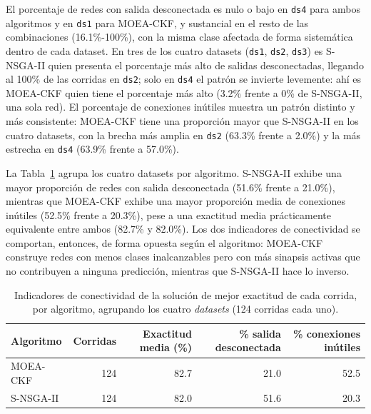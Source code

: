 El porcentaje de redes con salida desconectada es nulo o bajo en \texttt{ds4} para ambos algoritmos y en \texttt{ds1} para MOEA-CKF, y sustancial en el resto de las combinaciones (16.1\%-100\%), con la misma clase afectada de forma sistemática dentro de cada dataset. En tres de los cuatro datasets (\texttt{ds1}, \texttt{ds2}, \texttt{ds3}) es S-NSGA-II quien presenta el porcentaje más alto de salidas desconectadas, llegando al 100\% de las corridas en \texttt{ds2}; solo en \texttt{ds4} el patrón se invierte levemente: ahí es MOEA-CKF quien tiene el porcentaje más alto (3.2\% frente a 0\% de S-NSGA-II, una sola red). El porcentaje de conexiones inútiles muestra un patrón distinto y más consistente: MOEA-CKF tiene una proporción mayor que S-NSGA-II en los cuatro datasets, con la brecha más amplia en \texttt{ds2} (63.3\% frente a 2.0\%) y la más estrecha en \texttt{ds4} (63.9\% frente a 57.0\%).

La Tabla~\ref{tab:conectividad-algo} agrupa los cuatro datasets por algoritmo. S-NSGA-II exhibe una mayor proporción de redes con salida desconectada (51.6\% frente a 21.0\%), mientras que MOEA-CKF exhibe una mayor proporción media de conexiones inútiles (52.5\% frente a 20.3\%), pese a una exactitud media prácticamente equivalente entre ambos (82.7\% y 82.0\%). Los dos indicadores de conectividad se comportan, entonces, de forma opuesta según el algoritmo: MOEA-CKF construye redes con menos clases inalcanzables pero con más sinapsis activas que no contribuyen a ninguna predicción, mientras que S-NSGA-II hace lo inverso.

\begin{table}[htbp]
\centering
\small
\caption{Indicadores de conectividad de la solución de mejor exactitud de cada corrida, por algoritmo, agrupando los cuatro \textit{datasets} (124 corridas cada uno).}
\label{tab:conectividad-algo}
\begin{tabular}{lrrrr}
\toprule
\textbf{Algoritmo} & \textbf{Corridas} & \textbf{Exactitud media} (\%) & \% \textbf{salida desconectada} & \% \textbf{conexiones inútiles} \\
\midrule
MOEA-CKF & 124 & 82.7 & 21.0 & 52.5 \\
S-NSGA-II & 124 & 82.0 & 51.6 & 20.3 \\
\bottomrule
\end{tabular}
\end{table}


